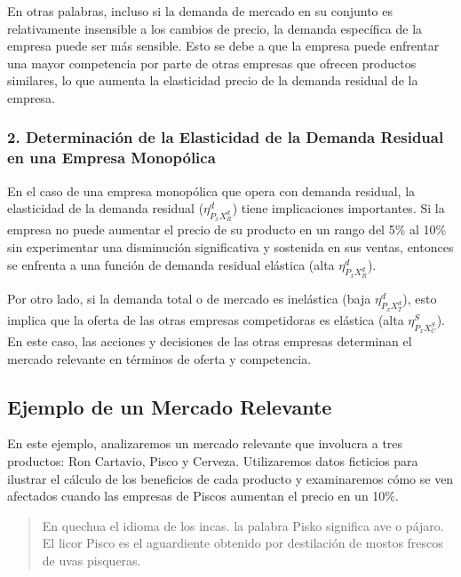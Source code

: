 \documentclass[
  a4paper,
]{article}
\begin{document}
En otras palabras, incluso si la demanda de mercado en su conjunto es
relativamente insensible a los cambios de precio, la demanda específica
de la empresa puede ser más sensible. Esto se debe a que la empresa
puede enfrentar una mayor competencia por parte de otras empresas que
ofrecen productos similares, lo que aumenta la elasticidad precio de la
demanda residual de la empresa.

\hypertarget{determinaciuxf3n-de-la-elasticidad-de-la-demanda-residual-en-una-empresa-monopuxf3lica}{%
\subsubsection{2. Determinación de la Elasticidad de la Demanda Residual
en una Empresa
Monopólica}\label{determinaciuxf3n-de-la-elasticidad-de-la-demanda-residual-en-una-empresa-monopuxf3lica}}

En el caso de una empresa monopólica que opera con demanda residual, la
elasticidad de la demanda residual (\(\eta_{P_{x}X_R^d}^d\)) tiene
implicaciones importantes. Si la empresa no puede aumentar el precio de
su producto en un rango del 5\% al 10\% sin experimentar una disminución
significativa y sostenida en sus ventas, entonces se enfrenta a una
función de demanda residual elástica (alta \(\eta_{P_{x}X_R^d}^d\)).

Por otro lado, si la demanda total o de mercado es inelástica (baja
\(\eta_{P_{x}X_T^d}^d\)), esto implica que la oferta de las otras
empresas competidoras es elástica (alta \(\eta_{P_{x}X_C^S}^S\)). En
este caso, las acciones y decisiones de las otras empresas determinan el
mercado relevante en términos de oferta y competencia.

\hypertarget{ejemplo-de-un-mercado-relevante}{%
\subsection{Ejemplo de un Mercado
Relevante}\label{ejemplo-de-un-mercado-relevante}}

En este ejemplo, analizaremos un mercado relevante que involucra a tres
productos: Ron Cartavio, Pisco y Cerveza. Utilizaremos datos ficticios
para ilustrar el cálculo de los beneficios de cada producto y
examinaremos cómo se ven afectados cuando las empresas de Piscos
aumentan el precio en un 10\%.

\begin{quote}
En quechua el idioma de los incas. la palabra Pisko significa ave o
pájaro. El licor Pisco es el aguardiente obtenido por destilación de
mostos frescos de uvas pisqueras.
\end{quote}
\end{document}
